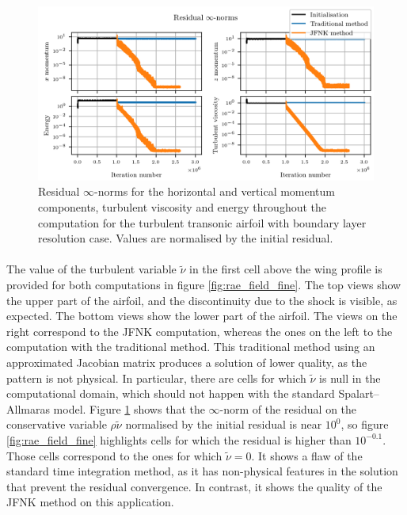        \begin{figure}
          \centering
          \includegraphics{figures/rae_residuals_fine_linf.png}
          \caption{Residual $\infty$-norms for the horizontal and vertical momentum components, turbulent viscosity and energy throughout the computation for the turbulent transonic airfoil with boundary layer resolution case.
          Values are normalised by the initial residual.}
          \label{fig:rae_residuals_fine_linf}
        \end{figure}

        \paragraph{}
        The value of the turbulent variable $\tilde{\nu}$ in the first cell above the wing profile is provided for both computations in figure \ref{fig:rae_field_fine}.
        The top views show the upper part of the airfoil, and the discontinuity due to the shock is visible, as expected.
        The bottom views show the lower part of the airfoil.
        The views on the right correspond to the JFNK computation, whereas the ones on the left to the computation with the traditional method.
        This traditional method using an approximated Jacobian matrix produces a solution of lower quality, as the pattern is not physical.
        In particular, there are cells for which $\tilde{\nu}$ is null in the computational domain, which should not happen with the standard Spalart--Allmaras model.
        Figure \ref{fig:rae_residuals_fine_linf} shows that the $\infty$-norm of the residual on the conservative variable $\rho \tilde{\nu}$ normalised by the initial residual is near $10^0$, so figure \ref{fig:rae_field_fine} highlights cells for which the residual is higher than $10^{-0.1}$.
        Those cells correspond to the ones for which $\tilde{\nu} = 0$.
        It shows a flaw of the standard time integration method, as it has non-physical features in the solution that prevent the residual convergence.
        In contrast, it shows the quality of the JFNK method on this application.

